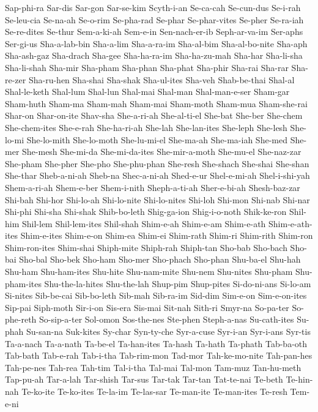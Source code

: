 {  Sap-phi-ra Sar-dis Sar-gon Sar-se-kim Scyth-i-an Se-ca-cah
  Se-cun-dus Se-i-rah Se-leu-cia Se-na-ah Se-o-rim Se-pha-rad
  Se-phar Se-phar-vites Se-pher Se-ra-iah Se-re-dites Se-thur
  Sem-a-ki-ah Sem-e-in Sen-nach-er-ib Seph-ar-va-im Ser-aphs Ser-gi-us
  Sha-a-lab-bin Sha-a-lim Sha-a-ra-im Sha-al-bim Sha-al-bo-nite Sha-aph
  Sha-ash-gaz Sha-drach Sha-gee Sha-ha-ra-im Sha-ha-zu-mah Sha-har
  Sha-li-sha Sha-li-shah Sha-mir Sha-pham Sha-phan Sha-phat
  Sha-phir Sha-rai Sha-rar Sha-re-zer Sha-ru-hen Sha-shai
  Sha-shak Sha-ul-ites Sha-veh Shab-be-thai Shal-al Shal-le-keth
  Shal-lum Shal-lun Shal-mai Shal-man Shal-man-e-ser Sham-gar
  Sham-huth Sham-ma Sham-mah Sham-mai Sham-moth Sham-mua
  Sham-she-rai Shar-on Shar-on-ite Shav-sha She-a-ri-ah She-al-ti-el
  She-bat She-ber She-chem She-chem-ites She-e-rah She-ha-ri-ah
  She-lah She-lan-ites She-leph She-lesh She-lo-mi She-lo-mith
  She-lo-moth She-lu-mi-el She-ma-ah She-ma-iah She-med She-mer
  She-mesh She-mi-da She-mi-da-ites She-mir-a-moth She-mu-el She-naz-zar
  She-pham She-pher She-pho She-phu-phan She-resh She-shach
  She-shai She-shan She-thar Sheb-a-ni-ah Sheb-na Shec-a-ni-ah
  Shed-e-ur Shel-e-mi-ah Shel-i-shi-yah Shem-a-ri-ah Shem-e-ber Shem-i-nith
  Sheph-a-ti-ah Sher-e-bi-ah Shesh-baz-zar Shi-bah Shi-hor Shi-lo-ah
  Shi-lo-nite Shi-lo-nites Shi-loh Shi-mon Shi-nab Shi-nar
  Shi-phi Shi-sha Shi-shak Shib-bo-leth Shig-ga-ion Shig-i-o-noth
  Shik-ke-ron Shil-him Shil-lem Shil-lem-ites Shil-shah Shim-e-ah
  Shim-e-am Shim-e-ath Shim-e-ath-ites Shim-e-ites Shim-e-on Shim-ea
  Shim-ei Shim-rath Shim-ri Shim-rith Shim-ron Shim-ron-ites
  Shim-shai Shiph-mite Shiph-rah Shiph-tan Sho-bab Sho-bach
  Sho-bai Sho-bal Sho-bek Sho-ham Sho-mer Sho-phach
  Sho-phan Shu-ba-el Shu-hah Shu-ham Shu-ham-ites Shu-hite
  Shu-nam-mite Shu-nem Shu-nites Shu-pham Shu-pham-ites Shu-the-la-hites
  Shu-the-lah Shup-pim Shup-pites Si-do-ni-ans Si-lo-am Si-nites
  Sib-be-cai Sib-bo-leth Sib-mah Sib-ra-im Sid-dim Sim-e-on
  Sim-e-on-ites Sip-pai Siph-moth Sir-i-on Sis-era Sis-mai
  Sit-nah Sith-ri Smyr-na So-pa-ter So-phe-reth So-sip-a-ter
  Sol-omon Sos-the-nes Ste-phen Steph-a-nas Su-cath-ites Su-phah
  Su-san-na Suk-kites Sy-char Syn-ty-che Syr-a-cuse Syr-i-an
  Syr-i-ans Syr-tis Ta-a-nach Ta-a-nath Ta-be-el Ta-han-ites
  Ta-hash Ta-hath Ta-phath Tab-ba-oth Tab-bath Tab-e-rah
  Tab-i-tha Tab-rim-mon Tad-mor Tah-ke-mo-nite Tah-pan-hes Tah-pe-nes
  Tah-rea Tah-tim Tal-i-tha Tal-mai Tal-mon Tam-muz
  Tan-hu-meth Tap-pu-ah Tar-a-lah Tar-shish Tar-sus Tar-tak
  Tar-tan Tat-te-nai Te-beth Te-hin-nah Te-ko-ite Te-ko-ites
  Te-la-im Te-las-sar Te-man-ite Te-man-ites Te-resh Tem-e-ni
}
